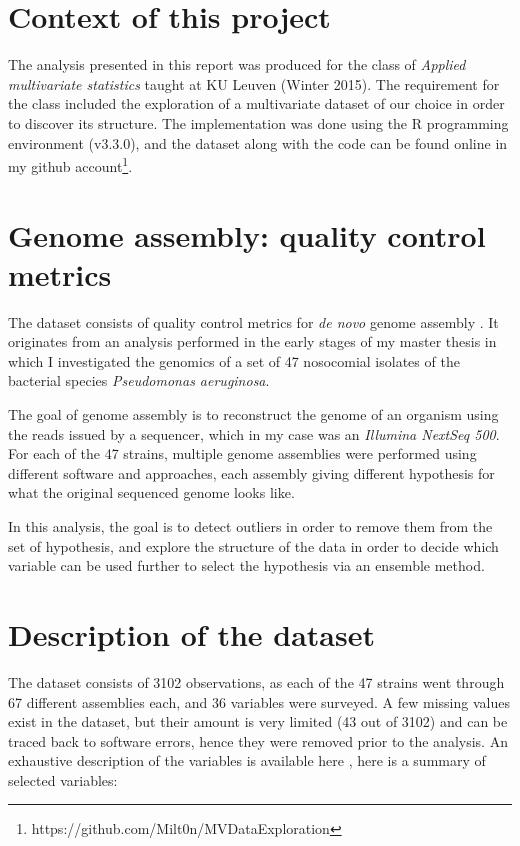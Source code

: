 \documentclass[11pt, a4paper,titlepage]{article}
\begin{document}


\section{Context of this project}

The analysis presented in this report was produced for the class of
\emph{Applied multivariate statistics} taught at KU Leuven (Winter
2015). The requirement for the class included the exploration of a
multivariate dataset of our choice in order to discover its
structure. The implementation was done using the R programming
environment (v3.3.0), and the dataset along with the code can be found
online in my github
account\footnote{https://github.com/Milt0n/MVDataExploration}.

\section{Genome assembly: quality control metrics}

The dataset consists of quality control metrics for \emph{de novo}
genome assembly \cite{baker2012novo}. It originates from an analysis
performed in the early stages of my master thesis in which I
investigated the genomics of a set of 47 nosocomial isolates of the
bacterial species \emph{Pseudomonas aeruginosa}.

The goal of genome assembly is to reconstruct the genome of an
organism using the reads issued by a sequencer, which in my case was
an \emph{Illumina NextSeq 500}. For each of the 47 strains, multiple
genome assemblies were performed using different software and
approaches, each assembly giving different hypothesis for what the
original sequenced genome looks like.

In this analysis, the goal is to detect outliers in order to remove
them from the set of hypothesis, and explore the structure of the data
in order to decide which variable can be used further to select the
hypothesis via an ensemble method.

\section{Description of the dataset}

The dataset consists of 3102 observations, as each of the 47 strains
went through 67 different assemblies each, and 36 variables were
surveyed. A few missing values exist in the dataset, but their amount
is very limited (43 out of 3102) and can be traced back to software
errors, hence they were removed prior to the analysis. An exhaustive
description of the variables is available here
\cite{gurevich2013quast}, here is a summary of selected variables:
\end{document}
